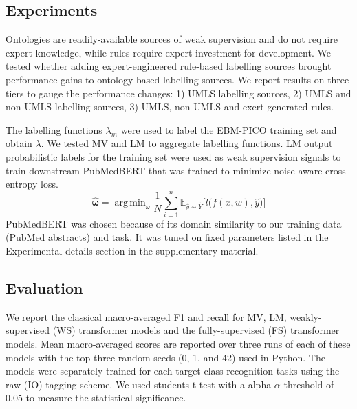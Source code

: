 \documentclass[10.7pt,]{article}
\DeclareMathOperator*{\argmin}{arg\,min}
\begin{document}
\subsection{Experiments}\label{subsec:experiments}
%
Ontologies are readily-available sources of weak supervision and do not require expert knowledge, while rules require expert investment for development.
We tested whether adding expert-engineered rule-based labelling sources brought performance gains to ontology-based labelling sources.
We report results on three tiers to gauge the performance changes: 1) UMLS labelling sources, 2) UMLS and non-UMLS labelling sources, 3) UMLS, non-UMLS and exert generated rules. 


The labelling functions $\lambda_{m}$ were used to label the EBM-PICO training set and obtain $\lambda$. 
We tested MV and LM to aggregate labelling functions.
LM output probabilistic labels for the training set were used as weak supervision signals to train downstream PubMedBERT that was trained to minimize noise-aware cross-entropy loss.
%
\begin{equation}
\bm{\hat{\omega}} = \argmin_{\omega} \frac{1}{N} \sum_{i=1}^{n} \mathbb{ E }_{ \hat{y} \sim \hat{Y}} \big[ l \big( f(x, w), \hat{y} \big) \big]
\end{equation}
%
PubMedBERT was chosen because of its domain similarity to our training data (PubMed abstracts) and task.
It was tuned on fixed parameters listed in the Experimental details section in the supplementary material. 
%
%
%
\subsection{Evaluation}\label{eval}
%
We report the classical macro-averaged F1 and recall for MV, LM, weakly-supervised (WS) transformer models and the fully-supervised (FS) transformer models.
Mean macro-averaged scores are reported over three runs of each of these models with the top three random seeds (0, 1, and 42) used in Python.
The models were separately trained for each target class recognition tasks using the raw (IO) tagging scheme.
We used students t-test with a alpha $\alpha$ threshold of 0.05 to measure the statistical significance.
%
%
%
\end{document}
